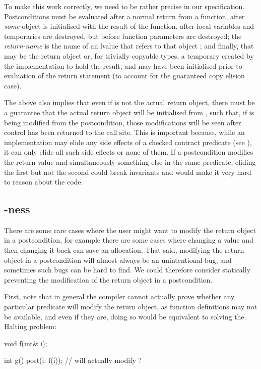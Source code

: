 To make this work correctly, we need to be rather precise in our specification. Postconditions must be evaluated after a normal return from a function, after \emph{some} object  is initialised with the result of the function, after local variables and temporaries are destroyed, but before function parameters are destroyed; the \emph{return-name} is the name of an lvalue that refers to that object ; and finally, that  may be the return object or, for trivially copyable types, a temporary created by the implementation to hold the result, and may have been initialised prior to evaluation of the return statement (to account for the guaranteed copy elision case).

The above also implies that even if  is not the actual return object, there must be a guarantee that the actual return object will be initialised from , such that, if  is being modified from the postcondition, those modifications will be seen after control has been returned to the call site. This is important because, while an implementation may elide any side effects of a checked contract predicate (see \cite{P2751R1}), it can only elide all such side effects or none of them. If a postcondition modifies the return value and simultaneously something else in the same predicate, eliding the first but not the second could break invariants and would make it very hard to reason about the code.

\subsection{-ness}

There are some rare cases where the user might want to modify the return object in a postcondition, for example there are some cases where changing a value and then changing it back can save an allocation. That said, modifying the return object in a postcondition will almost always be an unintentional bug, and sometimes such bugs can be hard to find. We could therefore consider statically preventing the modification of the return object in a postcondition.

First, note that in general the compiler cannot actually prove whether any particular predicate will modify the return object, as function definitions may not be available, and even if they are, doing so would be equivalent to solving the Halting problem:

\begin{codeblock}
void f(int& i); 

int g()
  post(i: f(i)); // will  actually modify ?
\end{codeblock}
 
